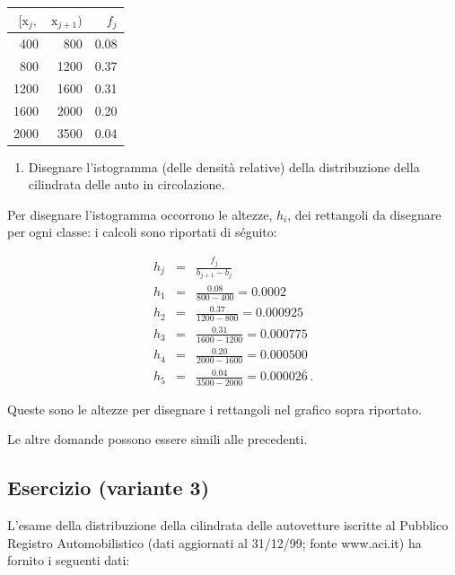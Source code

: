 \documentclass[
  11pt,
]{book}
\providecommand{\tightlist}{%
  \setlength{\itemsep}{0pt}\setlength{\parskip}{0pt}}
\theoremstyle{mytheoremstyle}
\theoremstyle{mydefstyle}
\newenvironment{sol}
  {
  \begin{tcolorbox}[enhanced,breakable,arc=0.1mm,boxrule=1pt,colback=white,colframe=iblue,
  title=\bf \fontfamily{lmss}\selectfont \hspace{.5 cm} Soluzione,drop fuzzy shadow]

}{
\end{tcolorbox}
  }
\begin{document}
\begin{tabular}{rrr}
\toprule
$[\text{x}_j,$ & $\text{x}_{j+1})$ & $f_j$\\
\midrule
400 & 800 & 0.08\\
800 & 1200 & 0.37\\
1200 & 1600 & 0.31\\
1600 & 2000 & 0.20\\
2000 & 3500 & 0.04\\
\bottomrule
\end{tabular}

\begin{enumerate}
\def\labelenumi{\alph{enumi}.}
\tightlist
\item
  Disegnare l'istogramma (delle densità relative) della
  distribuzione della cilindrata delle auto in circolazione.
\end{enumerate}

\begin{sol}
Per disegnare l'istogramma occorrono le altezze, \(h_{i}\),
dei rettangoli da disegnare per ogni classe: i calcoli sono
riportati di séguito:

\begin{eqnarray*}
h_{j} &=& \frac{f_{j}} {b_{j+1} - b_{j}}                \\
h_{1} &=& \frac{0.08} { 800 -  400} =  0.0002   \\
h_{2} &=& \frac{0.37} {1200 -  800} =  0.000925 \\
h_{3} &=& \frac{0.31} {1600 - 1200} =  0.000775 \\
h_{4} &=& \frac{0.20} {2000 - 1600} =  0.000500 \\
h_{5} &=& \frac{0.04} {3500 - 2000} =  0.00002\bar{6} \, .
\end{eqnarray*}

Queste sono le altezze per disegnare i rettangoli nel grafico
sopra riportato.

Le altre domande possono essere simili alle precedenti.

\end{sol}

\subsection{Esercizio (variante 3)}\label{esercizio-variante-3}

L'esame della distribuzione della cilindrata delle autovetture
iscritte al Pubblico Registro Automobilistico (dati aggiornati
al 31/12/99; fonte www.aci.it) ha fornito i seguenti dati:
\end{document}
